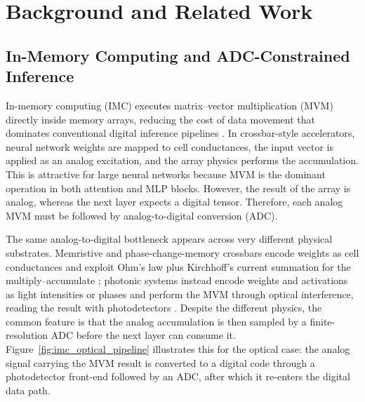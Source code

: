 \documentclass[a4paper,11pt,oneside]{article}
\theoremstyle{breakstyle}
\begin{document}
\section{Background and Related Work}
\label{sec:background}

\subsection{In-Memory Computing and ADC-Constrained Inference}
\label{subsec:imc_adc}

In-memory computing (IMC) executes matrix--vector multiplication (MVM)
directly inside memory arrays, reducing the cost of data movement that
dominates conventional digital inference pipelines
\cite{Xiao2021AnalogAccuracy,LeGallo2023AnalogNAS,Buechel2025AnalogFoundation}.
In crossbar-style accelerators, neural network weights are mapped to
cell conductances, the input vector is applied as an analog excitation,
and the array physics performs the accumulation. This is attractive for
large neural networks because MVM is the dominant operation in both
attention and MLP blocks. However, the result of the array is analog,
whereas the next layer expects a digital tensor. Therefore, each analog
MVM must be followed by analog-to-digital conversion (ADC).

The same analog-to-digital bottleneck appears across very different
physical substrates. Memristive and phase-change-memory crossbars
encode weights as cell conductances and exploit Ohm's law plus
Kirchhoff's current summation for the multiply--accumulate
\cite{Xiao2021AnalogAccuracy,LeGallo2023AnalogNAS,Buechel2025AnalogFoundation};
photonic systems instead encode weights and activations as light
intensities or phases and perform the MVM through optical
interference, reading the result with photodetectors
\cite{Spall2022HybridOptical}. Despite the different physics, the
common feature is that the analog accumulation is then sampled by a
finite-resolution ADC before the next layer can consume it.
Figure~\ref{fig:imc_optical_pipeline} illustrates this for the optical
case: the analog signal carrying the MVM result is converted to a
digital code through a photodetector front-end followed by an ADC,
after which it re-enters the digital data path.
\end{document}
